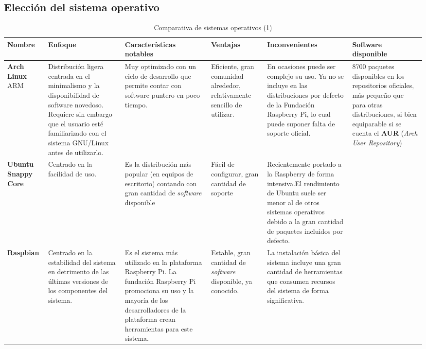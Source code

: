 
\begin{landscape}
\subsection{Elección del sistema operativo}
\label{os:evaluation}
\begin{table}[h]
\begin{tabular}{|p{2cm}|p{4cm}|p{5cm}|p{3cm}|p{4cm}|p{4cm}|}
\hline
\textbf{Nombre} & \textbf{Enfoque} & \textbf{Características notables} & \textbf{Ventajas} & \textbf{Inconvenientes} & \textbf{Software disponible}\\ \hline
\textbf{Arch Linux} ARM & Distribución ligera centrada en el minimalismo y la disponibilidad de software novedoso. Requiere sin embargo que el usuario esté familiarizado con el sistema GNU/Linux antes de utilizarlo. & Muy optimizado con un ciclo de desarrollo que permite contar con software puntero en poco tiempo. & Eficiente, gran comunidad alrededor, relativamente sencillo de utilizar. & En ocasiones puede ser complejo su uso. Ya no se incluye en las distribuciones por defecto de la Fundación Raspberry Pi, lo cual puede suponer falta de soporte oficial. & 8700 paquetes disponibles en los repositorios oficiales, más pequeño que para otras distribuciones, si bien equiparable si se cuenta el \textbf{AUR} (\textit{Arch User Repository})\\ \hline

\textbf{Ubuntu Snappy Core} & Centrado en la facilidad de uso. & Es la distribución más popular (en equipos de escritorio) contando con gran cantidad de \textit{software} disponible & Fácil de configurar, gran cantidad de soporte & Recientemente portado a la Raspberry de forma intensiva.El rendimiento de Ubuntu suele ser menor al de otros sistemas operativos debido a la gran cantidad de paquetes incluidos por defecto. & \\ \hline 

\textbf{Raspbian} & Centrado en la estabilidad del sistema en detrimento de las últimas versiones de los componentes del sistema. & Es el sistema más utilizado en la plataforma Raspberry Pi. La fundación Raspberry Pi promociona su uso y la mayoría de los desarrolladores de la plataforma crean herramientas para este sistema. & Estable, gran cantidad de \textit{software} disponible, ya conocido. & La instalación básica del sistema incluye una gran cantidad de herramientas que consumen recursos del sistema de forma significativa. &\\ \hline
\end{tabular}
\caption{Comparativa de sistemas operativos (1)}
\end{table}
\end{landscape}

